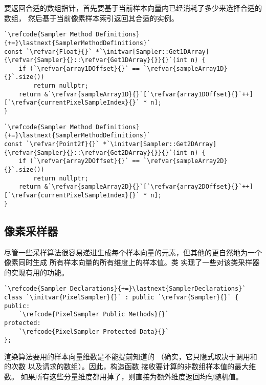 要返回合适的数组指针，首先要基于当前样本向量内已经消耗了多少来选择合适的数组，
然后基于当前像素样本索引返回其合适的实例。
\begin{lstlisting}
`\refcode{Sampler Method Definitions}{+=}\lastnext{SamplerMethodDefinitions}`
const `\refvar{Float}{}` *`\initvar[Sampler::Get1DArray]{\refvar{Sampler}{}::\refvar{Get1DArray}{}}{}`(int n) {
    if (`\refvar{array1DOffset}{}` == `\refvar{sampleArray1D}{}`.size())
        return nullptr;
    return &`\refvar{sampleArray1D}{}`[`\refvar{array1DOffset}{}`++][`\refvar{currentPixelSampleIndex}{}` * n];
}
\end{lstlisting}
\begin{lstlisting}
`\refcode{Sampler Method Definitions}{+=}\lastnext{SamplerMethodDefinitions}`
const `\refvar{Point2f}{}` *`\initvar[Sampler::Get2DArray]{\refvar{Sampler}{}::\refvar{Get2DArray}{}}{}`(int n) {
    if (`\refvar{array2DOffset}{}` == `\refvar{sampleArray2D}{}`.size())
        return nullptr;
    return &`\refvar{sampleArray2D}{}`[`\refvar{array2DOffset}{}`++][`\refvar{currentPixelSampleIndex}{}` * n];
}
\end{lstlisting}

\subsection{像素采样器}\label{sub:像素采样器}
尽管一些采样算法很容易递进生成每个样本向量的元素，但其他的更自然地为一个像素同时生成
所有样本向量的所有维度上的样本值。类
实现了一些对该类采样器的实现有用的功能。
\begin{lstlisting}
`\refcode{Sampler Declarations}{+=}\lastnext{SamplerDeclarations}`
class `\initvar{PixelSampler}{}` : public `\refvar{Sampler}{}` {
public:
    `\refcode{PixelSampler Public Methods}{}`
protected:
    `\refcode{PixelSampler Protected Data}{}`
};
\end{lstlisting}

渲染算法要用的样本向量维数是不能提前知道的
（确实，它只隐式取决于调用和的次数
以及请求的数组）。因此，构造函数
接收要计算的非数组样本值的最大维数。
如果所有这些分量维度都用掉了，则直接为额外维度返回均匀随机值。


